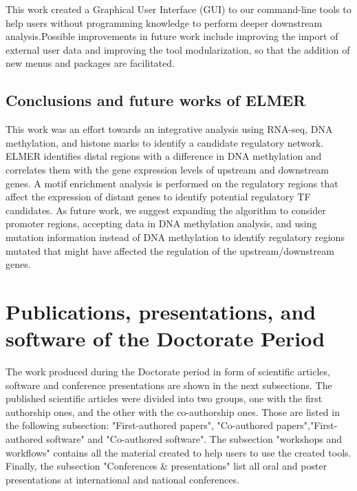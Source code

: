This work created a Graphical User Interface (GUI) to our command-line tools to help users without programming knowledge to perform deeper downstream analysis.Possible improvements in future work include improving the import of external user data and improving the tool modularization, so that the addition of new menus and packages are facilitated.

\subsection{Conclusions and future works of ELMER}

This work was an effort towards an integrative analysis
using RNA-seq, DNA methylation, and histone marks to identify a candidate regulatory network.
ELMER identifies distal regions with a difference in DNA methylation and correlates them
with the gene expression levels of upstream and downstream genes.
A motif enrichment analysis is performed on the regulatory regions that affect the expression of distant genes to identify potential
regulatory TF candidates. As future work, we suggest expanding the algorithm to consider promoter regions,  accepting  data in  DNA methylation analysis, and using mutation information instead of DNA methylation
to identify regulatory regions mutated that might have affected the regulation of the upstream/downstream genes.

\section{Publications, presentations, and software of the Doctorate Period}

The work produced during the Doctorate period in form of scientific articles,
software and conference presentations are shown in the next subsections.
The published scientific articles were divided into two groups, one with the first authorship ones, and the other with the co-authorship ones. Those are listed in the following subsection: "First-authored papers", "Co-authored papers","First-authored software" and "Co-authored software".
The subsection "workshops and workflows" contains all the material created to help users to use the created tools. Finally, the subsection "Conferences \& presentations" list all oral and poster presentations at international and national conferences.

